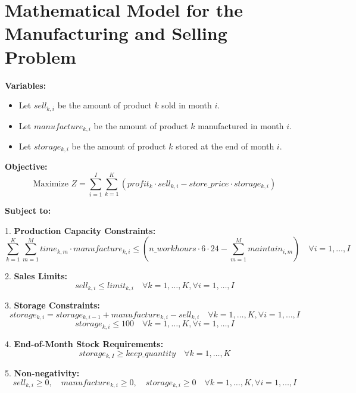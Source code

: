 \documentclass{article}
\begin{document}
\section*{Mathematical Model for the Manufacturing and Selling Problem}

\textbf{Variables:}
\begin{itemize}
    \item Let \( sell_{k, i} \) be the amount of product \( k \) sold in month \( i \).
    \item Let \( manufacture_{k, i} \) be the amount of product \( k \) manufactured in month \( i \).
    \item Let \( storage_{k, i} \) be the amount of product \( k \) stored at the end of month \( i \).
\end{itemize}

\textbf{Objective:}
\[
\text{Maximize } Z = \sum_{i=1}^{I} \sum_{k=1}^{K} \left( profit_k \cdot sell_{k,i} - store\_price \cdot storage_{k,i} \right)
\]

\textbf{Subject to:}

1. \textbf{Production Capacity Constraints:}
\[
\sum_{k=1}^{K} \sum_{m=1}^{M} time_{k,m} \cdot manufacture_{k,i} \leq \left( n\_workhours \cdot 6 \cdot 24 - \sum_{m=1}^{M} maintain_{i,m} \right) \quad \forall i = 1, \ldots, I
\]

2. \textbf{Sales Limits:}
\[
sell_{k,i} \leq limit_{k,i} \quad \forall k = 1, \ldots, K, \forall i = 1, \ldots, I
\]

3. \textbf{Storage Constraints:}
\[
storage_{k,i} = storage_{k,i-1} + manufacture_{k,i} - sell_{k,i} \quad \forall k = 1, \ldots, K, \forall i = 1, \ldots, I
\]
\[
storage_{k,i} \leq 100 \quad \forall k = 1, \ldots, K, \forall i = 1, \ldots, I
\]

4. \textbf{End-of-Month Stock Requirements:}
\[
storage_{k,I} \geq keep\_quantity \quad \forall k = 1, \ldots, K
\]

5. \textbf{Non-negativity:}
\[
sell_{k,i} \geq 0, \quad manufacture_{k,i} \geq 0, \quad storage_{k,i} \geq 0 \quad \forall k = 1, \ldots, K, \forall i = 1, \ldots, I
\]
\end{document}
